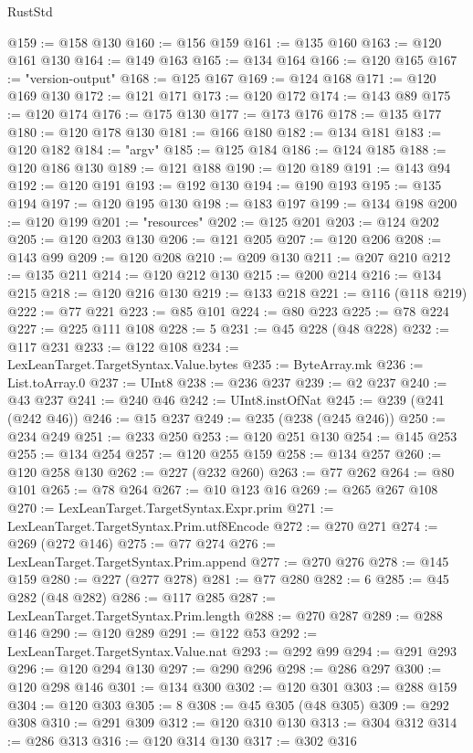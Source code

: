\begin{lexlean}{RustStd}
\begin{coremodule}
@159 := @158 @130
@160 := @156 @159
@161 := @135 @160
@163 := @120 @161 @130
@164 := @149 @163
@165 := @134 @164
@166 := @120 @165
@167 := "version-output"
@168 := @125 @167
@169 := @124 @168
@171 := @120 @169 @130
@172 := @121 @171
@173 := @120 @172
@174 := @143 @89
@175 := @120 @174
@176 := @175 @130
@177 := @173 @176
@178 := @135 @177
@180 := @120 @178 @130
@181 := @166 @180
@182 := @134 @181
@183 := @120 @182
@184 := "argv"
@185 := @125 @184
@186 := @124 @185
@188 := @120 @186 @130
@189 := @121 @188
@190 := @120 @189
@191 := @143 @94
@192 := @120 @191
@193 := @192 @130
@194 := @190 @193
@195 := @135 @194
@197 := @120 @195 @130
@198 := @183 @197
@199 := @134 @198
@200 := @120 @199
@201 := "resources"
@202 := @125 @201
@203 := @124 @202
@205 := @120 @203 @130
@206 := @121 @205
@207 := @120 @206
@208 := @143 @99
@209 := @120 @208
@210 := @209 @130
@211 := @207 @210
@212 := @135 @211
@214 := @120 @212 @130
@215 := @200 @214
@216 := @134 @215
@218 := @120 @216 @130
@219 := @133 @218
@221 := @116 (@118 @219)
@222 := @77 @221
@223 := @85 @101
@224 := @80 @223
@225 := @78 @224
@227 := @225 @111 @108
@228 := 5
@231 := @45 @228 (@48 @228)
@232 := @117 @231
@233 := @122 @108
@234 := LexLeanTarget.TargetSyntax.Value.bytes
@235 := ByteArray.mk
@236 := List.toArray.{0}
@237 := UInt8
@238 := @236 @237
@239 := @2 @237
@240 := @43 @237
@241 := @240 @46
@242 := UInt8.instOfNat
@245 := @239 (@241 (@242 @46))
@246 := @15 @237
@249 := @235 (@238 (@245 @246))
@250 := @234 @249
@251 := @233 @250
@253 := @120 @251 @130
@254 := @145 @253
@255 := @134 @254
@257 := @120 @255 @159
@258 := @134 @257
@260 := @120 @258 @130
@262 := @227 (@232 @260)
@263 := @77 @262
@264 := @80 @101
@265 := @78 @264
@267 := @10 @123 @16
@269 := @265 @267 @108
@270 := LexLeanTarget.TargetSyntax.Expr.prim
@271 := LexLeanTarget.TargetSyntax.Prim.utf8Encode
@272 := @270 @271
@274 := @269 (@272 @146)
@275 := @77 @274
@276 := LexLeanTarget.TargetSyntax.Prim.append
@277 := @270 @276
@278 := @145 @159
@280 := @227 (@277 @278)
@281 := @77 @280
@282 := 6
@285 := @45 @282 (@48 @282)
@286 := @117 @285
@287 := LexLeanTarget.TargetSyntax.Prim.length
@288 := @270 @287
@289 := @288 @146
@290 := @120 @289
@291 := @122 @53
@292 := LexLeanTarget.TargetSyntax.Value.nat
@293 := @292 @99
@294 := @291 @293
@296 := @120 @294 @130
@297 := @290 @296
@298 := @286 @297
@300 := @120 @298 @146
@301 := @134 @300
@302 := @120 @301
@303 := @288 @159
@304 := @120 @303
@305 := 8
@308 := @45 @305 (@48 @305)
@309 := @292 @308
@310 := @291 @309
@312 := @120 @310 @130
@313 := @304 @312
@314 := @286 @313
@316 := @120 @314 @130
@317 := @302 @316

\end{coremodule}
\end{lexlean}
